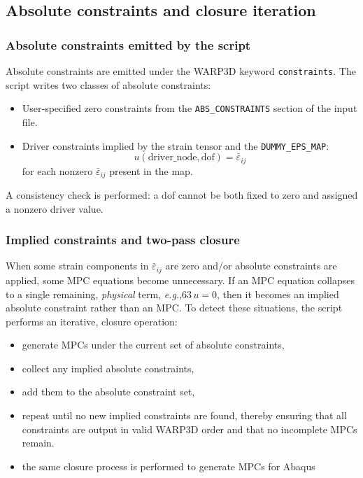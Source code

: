 \documentclass[11pt]{article}
\newcommand{\eg}{\emph{e.g.},\xspace}
\begin{document}
\subsection{Absolute constraints and closure iteration}
\subsubsection{Absolute constraints emitted by the script}
Absolute constraints are emitted under the WARP3D keyword \texttt{constraints}.
The script writes two classes of absolute constraints:
\begin{itemize}
\item User-specified zero constraints from the \texttt{ABS\_CONSTRAINTS} section of the input file.
\item Driver constraints implied by the strain tensor and the \texttt{DUMMY\_EPS\_MAP}:
\begin{equation}
u(\text{driver\_node},\text{dof}) = \bar{\varepsilon}_{ij}
\end{equation}
for each nonzero $\bar{\varepsilon}_{ij}$ present in the map.
\end{itemize}
A consistency check is performed: a dof cannot be both fixed to zero 
and assigned a nonzero driver value.

\subsubsection{Implied constraints and two-pass closure}
When some strain components in $\bar{\varepsilon}_{ij}$ are zero 
and/or absolute constraints are 
applied, some MPC equations become unnecessary.
If an MPC equation collapses to a single remaining, \emph{physical} 
term, \eg $63\,u=0$, then
it becomes an implied absolute constraint rather than an MPC.
To detect these situations, the script performs an iterative,
closure operation:
\begin{itemize}
\item generate MPCs under the current set of absolute constraints,
\item collect any implied absolute constraints,
\item add them to the absolute constraint set,
\item repeat until no new implied constraints are found,
thereby ensuring that all constraints are output in valid WARP3D order 
and that no incomplete MPCs remain.
\item the same closure process is performed to generate MPCs for Abaqus
\end{itemize}
\end{document}
